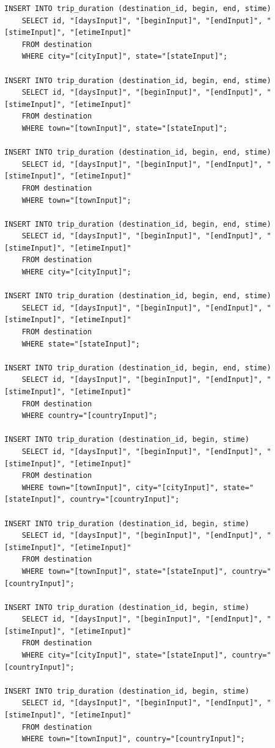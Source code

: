 \documentclass[letterpaper,10pt,onecolumn,compsoc]{IEEEtran}
\begin{document}
\begin{verbatim}
INSERT INTO trip_duration (destination_id, begin, end, stime) 
	SELECT id, "[daysInput]", "[beginInput]", "[endInput]", "[stimeInput]", "[etimeInput]" 
	FROM destination 
	WHERE city="[cityInput]", state="[stateInput]";
	
INSERT INTO trip_duration (destination_id, begin, end, stime) 
	SELECT id, "[daysInput]", "[beginInput]", "[endInput]", "[stimeInput]", "[etimeInput]" 
	FROM destination 
	WHERE town="[townInput]", state="[stateInput]";
	
INSERT INTO trip_duration (destination_id, begin, end, stime) 
	SELECT id, "[daysInput]", "[beginInput]", "[endInput]", "[stimeInput]", "[etimeInput]" 
	FROM destination 
	WHERE town="[townInput]";
	
INSERT INTO trip_duration (destination_id, begin, end, stime) 
	SELECT id, "[daysInput]", "[beginInput]", "[endInput]", "[stimeInput]", "[etimeInput]" 
	FROM destination 
	WHERE city="[cityInput]";
	
INSERT INTO trip_duration (destination_id, begin, end, stime) 
	SELECT id, "[daysInput]", "[beginInput]", "[endInput]", "[stimeInput]", "[etimeInput]" 
	FROM destination 
	WHERE state="[stateInput]";
	
INSERT INTO trip_duration (destination_id, begin, end, stime) 
	SELECT id, "[daysInput]", "[beginInput]", "[endInput]", "[stimeInput]", "[etimeInput]" 
	FROM destination 
	WHERE country="[countryInput]";
	
INSERT INTO trip_duration (destination_id, begin, stime) 
	SELECT id, "[daysInput]", "[beginInput]", "[endInput]", "[stimeInput]", "[etimeInput]" 
	FROM destination 
	WHERE town="[townInput]", city="[cityInput]", state="[stateInput]", country="[countryInput]";
	
INSERT INTO trip_duration (destination_id, begin, stime) 
	SELECT id, "[daysInput]", "[beginInput]", "[endInput]", "[stimeInput]", "[etimeInput]" 
	FROM destination 
	WHERE town="[townInput]", state="[stateInput]", country="[countryInput]";
	
INSERT INTO trip_duration (destination_id, begin, stime) 
	SELECT id, "[daysInput]", "[beginInput]", "[endInput]", "[stimeInput]", "[etimeInput]" 
	FROM destination 
	WHERE city="[cityInput]", state="[stateInput]", country="[countryInput]";
	
INSERT INTO trip_duration (destination_id, begin, stime) 
	SELECT id, "[daysInput]", "[beginInput]", "[endInput]", "[stimeInput]", "[etimeInput]" 
	FROM destination 
	WHERE town="[townInput]", country="[countryInput]";
	

\end{verbatim}
\end{document}
